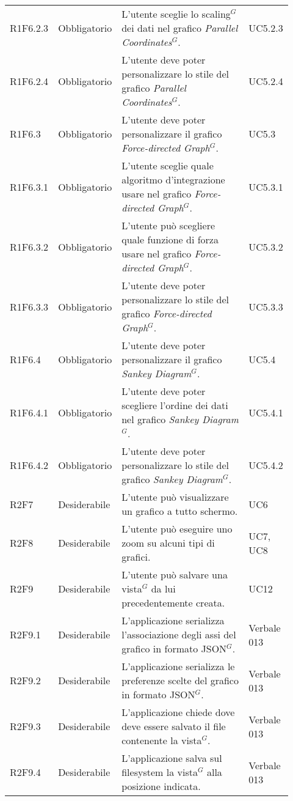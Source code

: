 {\begin{longtable}{p{0.12\linewidth}p{0.15\linewidth}p{0.50\linewidth}p{0.15\linewidth}}
    \rowcolor[RGB]{233, 245, 206}
    R1F6.2.3 & Obbligatorio & L'utente sceglie lo scaling$^{G}$ dei dati nel grafico \textit{Parallel Coordinates$^{G}$}. & UC5.2.3\\
    \rowcolor[RGB]{216, 235, 171}
    R1F6.2.4 & Obbligatorio & L'utente deve poter personalizzare lo stile del grafico \textit{Parallel Coordinates$^{G}$}. & UC5.2.4\\
    \rowcolor[RGB]{233, 245, 206}
    R1F6.3 & Obbligatorio & L'utente deve poter personalizzare il grafico \textit{Force-directed Graph$^{G}$}. & UC5.3\\
    \rowcolor[RGB]{216, 235, 171}
    R1F6.3.1 & Obbligatorio & L'utente sceglie quale algoritmo d'integrazione usare nel grafico \textit{Force-directed Graph$^{G}$}. & UC5.3.1\\
    \rowcolor[RGB]{233, 245, 206}
    R1F6.3.2 & Obbligatorio & L'utente può scegliere quale funzione di forza usare nel grafico \textit{Force-directed Graph$^{G}$}. & UC5.3.2\\
    \rowcolor[RGB]{216, 235, 171}
    R1F6.3.3 & Obbligatorio & L'utente deve poter personalizzare lo stile del grafico \textit{Force-directed Graph$^{G}$}. & UC5.3.3\\
    \rowcolor[RGB]{233, 245, 206}
    R1F6.4 & Obbligatorio & L'utente deve poter personalizzare il grafico \textit{Sankey Diagram$^{G}$}. & UC5.4\\
    \rowcolor[RGB]{216, 235, 171}
    R1F6.4.1 & Obbligatorio & L'utente deve poter scegliere l'ordine dei dati nel grafico \textit{Sankey Diagram$^{G}$}. & UC5.4.1\\
    \rowcolor[RGB]{233, 245, 206}
    R1F6.4.2 & Obbligatorio & L'utente deve poter personalizzare lo stile del grafico \textit{Sankey Diagram$^{G}$}. & UC5.4.2\\

    \rowcolor[RGB]{216, 235, 171}
    R2F7 & Desiderabile & L'utente può visualizzare un grafico a tutto schermo. & UC6\\
    \rowcolor[RGB]{233, 245, 206}
    R2F8 & Desiderabile & L'utente può eseguire uno zoom su alcuni tipi di grafici. & UC7, UC8\\
    \rowcolor[RGB]{216, 235, 171}
    R2F9 & Desiderabile & L'utente può salvare una vista$^{G}$ da lui precedentemente creata. & UC12\\
    \rowcolor[RGB]{233, 245, 206}
    R2F9.1 & Desiderabile & L'applicazione serializza l'associazione degli assi del grafico in formato JSON$^{G}$.& Verbale 013 \\
    \rowcolor[RGB]{216, 235, 171}
    R2F9.2 & Desiderabile & L'applicazione serializza le preferenze scelte del grafico in formato JSON$^{G}$.& Verbale 013 \\
    \rowcolor[RGB]{233, 245, 206}
    R2F9.3 & Desiderabile & L'applicazione chiede dove deve essere salvato il file  contenente la vista$^{G}$.& Verbale 013 \\
    \rowcolor[RGB]{216, 235, 171}
    R2F9.4 & Desiderabile & L'applicazione salva sul filesystem la vista$^{G}$ alla posizione indicata.& Verbale 013 \\


\end{longtable}}
